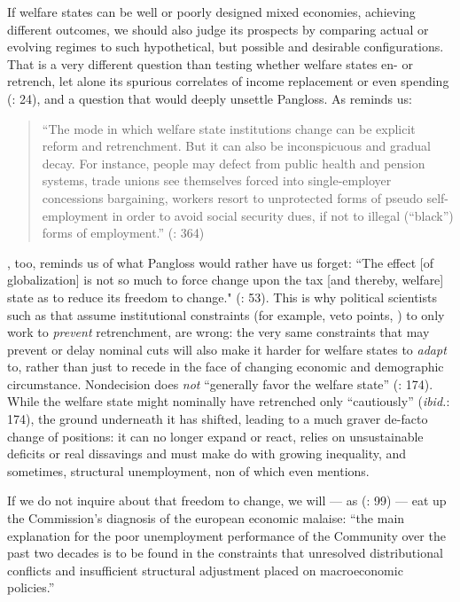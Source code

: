 If welfare states can be well or poorly designed mixed economies, achieving different outcomes, we should also judge its prospects by comparing actual or evolving regimes to such hypothetical, but possible and desirable configurations. That is a very different question than testing whether welfare states en- or retrench, let alone its spurious correlates of income replacement \citep{Swank-2005-aa} or even spending (\citealt{Kleinman2002}: 24), and a question that would deeply unsettle Pangloss. As \citeauthor{Offe2003} reminds us:
	\begin{quote}
		``The mode in which welfare state institutions change can be explicit reform and retrenchment. But it can also be inconspicuous and gradual decay. For instance, people may defect from public health and pension systems, trade unions see themselves forced into single-employer concessions bargaining, workers resort to unprotected forms of pseudo self-employment in order to avoid social security dues, if not to illegal (“black”) forms of employment.'' (\citeyear{Offe2003}: 364)
	\end{quote}
\citeauthor{Genschel2005}, too, reminds us of what Pangloss would rather have us forget: ``The effect [of globalization] is not so much to force change upon the tax [and thereby, welfare] state as to reduce its freedom to change." (\citeyear{Genschel2005}: 53). This is  why political scientists such as \cite{Pierson2002,Pierson1996} that assume institutional constraints (for example, veto points, \citealt{Tsebelis-2002-aa}) to only work to \emph{prevent} retrenchment, are wrong: the very same constraints that may prevent or delay nominal cuts will also make it harder for welfare states to \emph{adapt} to, rather than just to recede in the face of changing economic and demographic circumstance. Nondecision does \emph{not} ``generally favor the welfare state'' (\citealt{Pierson1996}: 174). While the welfare state might nominally have retrenched only ``cautiously'' (\emph{ibid.}: 174), the ground underneath it has shifted, leading to a much graver de-facto change of positions: it can no longer expand or react, relies on unsustainable deficits or real dissavings and must make do with growing inequality, and sometimes, structural unemployment, non of which \citeauthor{Pierson1996} even mentions.

If we do not inquire about that freedom to change, we will --- as \citeauthor{Kleinman2002} (\citeyear{Kleinman2002}: 99) --- eat up the Commission's diagnosis of the european economic malaise: ``the main explanation for the poor unemployment performance of the Community over the past two decades is to be found in the constraints that unresolved distributional conflicts and insufficient structural adjustment placed on macroeconomic policies.''

